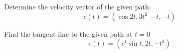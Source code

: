 \documentclass[openany]{book}
\begin{document}
\begin{prob}
    Determine the velocity vector of the given path:
    \begin{equation*}
        c(t)=(\cos 2t, 3t^2-t, -t)
    \end{equation*}
\end{prob}


\begin{prob}
    Find the tangent line to the given path at $t=0$
    \begin{equation*}
        c(t)=(e^t\sin t, 2t, -t^3)
    \end{equation*}
\end{prob}
\end{document}
